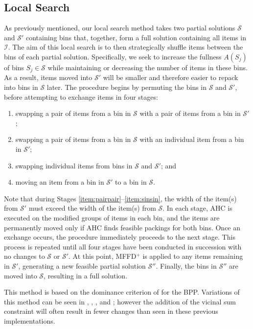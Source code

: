 \documentclass[a4paper,11pt,authoryear]{elsarticle}
\begin{document}
\subsection{Local Search}
\label{sub:localsearch}
\noindent As previously mentioned, our local search method takes two partial solutions $\mathcal{S}$ and $\mathcal{S}'$ containing bins that, together, form a full solution containing all items in $\mathcal{I}$. The aim of this local search is to then strategically shuffle items between the bins of each partial solution. Specifically, we seek to increase the fullness $A(S_j)$ of bins $S_j \in \mathcal{S}$ while maintaining or decreasing the number of items in these bins. As a result, items moved into $\mathcal{S}'$ will be smaller and therefore easier to repack into bins in $\mathcal{S}$ later. The procedure begins by permuting the bins in $\mathcal{S}$ and $\mathcal{S}'$, before attempting to exchange items in four stages:
\begin{enumerate}[label={(\arabic*)},itemsep=-0.2em]
	\item swapping a pair of items from a bin in $\mathcal{S}$ with a pair of items from a bin in $\mathcal{S}'$;\label{item:pairpair}
	\item swapping a pair of items from a bin in $\mathcal{S}$ with an individual item from a bin in $\mathcal{S}'$;\label{item:pairsin}
	\item swapping individual items from bins in $\mathcal{S}$ and $\mathcal{S}'$;\label{item:sinsin} and
	\item moving an item from a bin in $\mathcal{S}'$ to a bin in $\mathcal{S}$.\label{item:movesin}
\end{enumerate} 
Note that during Stages \ref{item:pairpair}--\ref{item:sinsin}, the width of the item(s) from $\mathcal{S}'$ must exceed the width of the item(s) from $\mathcal{S}$. In each stage, AHC is executed on the modified groups of items in each bin, and the items are permanently moved only if AHC finds feasible packings for both bins. Once an exchange occurs, the procedure immediately proceeds to the next stage. This process is repeated until all four stages have been conducted in succession with no changes to $\mathcal{S}$ or $\mathcal{S}'$. At this point, MFFD$^+$ is applied to any items remaining in $\mathcal{S}'$, generating a new feasible partial solution $\mathcal{S}''$. Finally, the bins in $\mathcal{S}''$ are moved into $\mathcal{S}$, resulting in a full solution.

This method is based on the dominance criterion of \cite{martello1990l} for the BPP. Variations of this method can be seen in \cite{falkenauer1996}, \cite{levine2004}, \cite{lewis2009}, and \cite{lewis2017}; however the addition of the vicinal sum constraint will often result in fewer changes than seen in these previous implementations.
\end{document}
